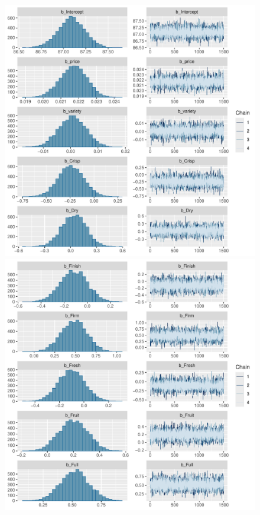 \documentclass{article}
\begin{document}
\begin{figure}[htbp]
	\centering
	\begin{minipage}{0.45\textwidth}
		\centering
		\includegraphics[width=\textwidth]{imgs/histograms_trace_plots_1.pdf}
	\end{minipage}
	\hfill
	\begin{minipage}{0.45\textwidth}
		\centering
		\includegraphics[width=\textwidth]{imgs/histograms_trace_plots_2.pdf}

\end{minipage}
\end{figure}
\end{document}
